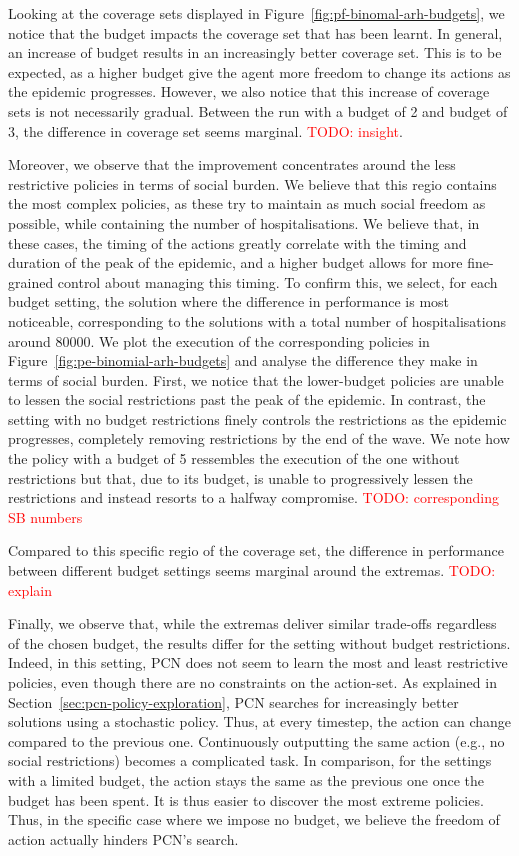 \documentclass{article}
\newcommand\todo[1]{\textcolor{red}{TODO: #1}}
\begin{document}
Looking at the coverage sets displayed in Figure~\ref{fig:pf-binomal-arh-budgets}, we notice that the budget impacts the coverage set that has been learnt. In general, an increase of budget results in an increasingly better coverage set. This is to be expected, as a higher budget give the agent more freedom to change its actions as the epidemic progresses. However, we also notice that this increase of coverage sets is not necessarily gradual. Between the run with a budget of 2 and budget of 3, the difference in coverage set seems marginal. \todo{insight}.

Moreover, we observe that the improvement concentrates around the less restrictive policies in terms of social burden. We believe that this regio contains the most complex policies, as these try to maintain as much social freedom as possible, while containing the number of hospitalisations. We believe that, in these cases, the timing of the actions greatly correlate with the timing and duration of the peak of the epidemic, and a higher budget allows for more fine-grained control about managing this timing. To confirm this, we select, for each budget setting, the solution where the difference in performance is most noticeable, corresponding to the solutions with a total number of hospitalisations around $80000$. We plot the execution of the corresponding policies in Figure~\ref{fig:pe-binomial-arh-budgets} and analyse the difference they make in terms of social burden. First, we notice that the lower-budget policies are unable to lessen the social restrictions past the peak of the epidemic. In contrast, the setting with no budget restrictions finely controls the restrictions as the epidemic progresses, completely removing restrictions by the end of the wave. We note how the policy with a budget of 5 ressembles the execution of the one without restrictions but that, due to its budget, is unable to progressively lessen the restrictions and instead resorts to a halfway compromise. \todo{corresponding SB numbers}

Compared to this specific regio of the coverage set, the difference in performance between different budget settings seems marginal around the extremas. \todo{explain}

Finally, we observe that, while the extremas deliver similar trade-offs regardless of the chosen budget, the results differ for the setting without budget restrictions. Indeed, in this setting, PCN does not seem to learn the most and least restrictive policies, even though there are no constraints on the action-set. As explained in Section~\ref{sec:pcn-policy-exploration}, PCN searches for increasingly better solutions using a stochastic policy. Thus, at every timestep, the action can change compared to the previous one. Continuously outputting the same action (e.g., no social restrictions) becomes a complicated task. In comparison, for the settings with a limited budget, the action stays the same as the previous one once the budget has been spent. It is thus easier to discover the most extreme policies. Thus, in the specific case where we impose no budget, we believe the freedom of action actually hinders PCN's search. 
\end{document}
